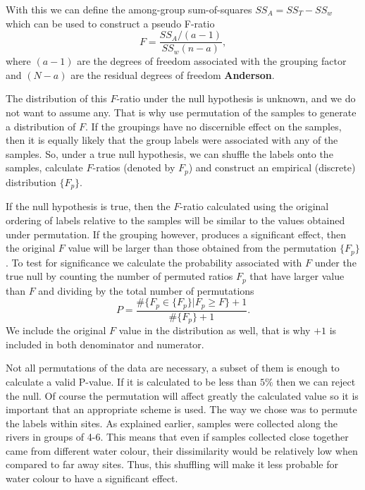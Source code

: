 With this we can define the among-group sum-of-squares $SS_A = SS_T - SS_w$ which can be used to construct a pseudo F-ratio
\begin{equation}
F=	\frac{SS_A/(a-1)}{SS_w (n-a)}, 
\end{equation}
where $(a-1)$ are the degrees of freedom associated with the grouping factor and $(N-a)$ are the residual degrees of freedom \textbf{Anderson}.

The distribution of this $F$-ratio under the null hypothesis is unknown, and we do not want to assume any. That is why use permutation of the samples to generate a distribution of $F$. If the groupings have no discernible effect on the samples, then it is equally likely that the group labels were associated with any of the samples. So, under a true null hypothesis, we can shuffle the labels onto the samples, calculate $F$-ratios (denoted by $F_p$) and construct an empirical (discrete) distribution $\{F_p\}$.

If the null hypothesis is true, then the $F$-ratio calculated using the original ordering of labels relative to the samples will be similar to the values obtained under permutation. If the grouping however, produces a significant effect, then the original $F$ value will be larger than those obtained from the permutation $\{F_p\}$. To test for significance we calculate the probability associated with $F$ under the true null by counting the number of permuted ratios $F_p$ that have larger value than $F$ and dividing by the total number of permutations
\begin{equation}
	P = \frac{\#\{F_p\in\{F_p\}| F_p \geq F \}+1}{\#\{F_p\}+1}.
\end{equation}  
We include the original $F$ value in the distribution as well, that is why $+1$ is included in both denominator and numerator.


Not all permutations of the data are necessary, a subset of them is enough to calculate a valid P-value. If it is calculated to be less than $5\%$ then we can reject the null. Of course the permutation will affect greatly the calculated value so it is important that an appropriate scheme is used. The way we chose was to permute the labels within sites. As explained earlier, samples were collected along the rivers in groups of 4-6. This means that even if samples collected close together came from different water colour, their dissimilarity would be relatively low when compared to far away sites. Thus, this shuffling will make it less probable for water colour to have a significant effect. 


